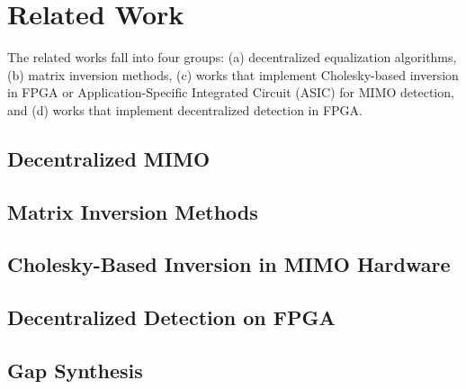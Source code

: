 \chapter{Related Work}\label{chap:relatedwork}
The related works fall into four groups: (a) decentralized equalization algorithms, (b) matrix inversion methods, (c) works that implement Cholesky-based inversion in FPGA or Application-Specific Integrated Circuit (ASIC) for MIMO detection, and (d) works that implement decentralized detection in FPGA.

\section{Decentralized MIMO}\label{subsec:decentralized-trabs}


\section{Matrix Inversion Methods}\label{sec:metodos-inversao}


\section{Cholesky-Based Inversion in MIMO Hardware}


\section{Decentralized Detection on FPGA}


\section{Gap Synthesis}

